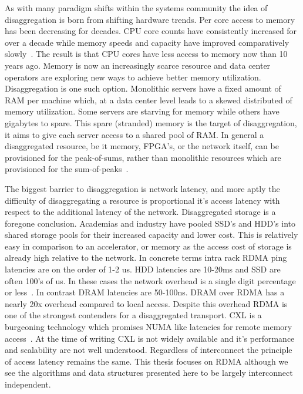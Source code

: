 \documentclass[12pt]{ucsddissertation}
\begin{document}
As with many paradigm shifts within the systems community the idea of disaggregation is born from
shifting hardware trends. Per core access to memory has been decreasing for decades. CPU core counts
have consistently increased for over a decade while memory speeds and capacity have improved
comparatively slowly~. The result is that CPU cores have less access to
memory now than 10 years ago. Memory is now an increasingly scarce resource and data center
operators are exploring new ways to achieve better memory utilization. Disaggregation is one such
option. Monolithic servers have a fixed amount of RAM per machine which, at a data center level leads
to a skewed distributed of memory utilization. Some servers are starving for memory while others
have gigabytes to spare. This spare (stranded) memory is the target of disaggregation, it aims to
give each server access to a shared pool of RAM. In general a disaggregated resource, be it memory,
FPGA's, or the network itself, can be provisioned for the peak-of-sums, rather than monolithic
resources which are provisioned for the sum-of-peaks~\cite{clio,supernic,dsnf}.

The biggest barrier to disaggregation is network latency, and more aptly the difficulty of
disaggregating a resource is proportional it's access latency with respect to the additional latency
of the network. Disaggregated storage is a foregone conclusion. Academias and industry have pooled
SSD's and HDD's into shared storage pools for their increased capacity and lower cost. This is
relatively easy in comparison to an accelerator, or memory as the access cost of storage is already
high relative to the network. In concrete terms intra rack RDMA ping latencies are on the order of
1-2 us. HDD latencies are 10-20ms and SSD are often 100's of us. In these cases the network overhead
is a single digit percentage or less~\cite{decible}. In
contrast DRAM latencies are 50-100ns. DRAM over RDMA has a nearly 20x overhead compared to local
access. Despite this overhead RDMA is one of the strongest contenders for a disaggregated transport.
CXL is a burgeoning technology which promises NUMA like latencies for remote memory
access~\cite{cxl}. At the time of writing CXL is not widely available and it's performance and
scalability are not well understood. Regardless of interconnect the principle of access latency
remains the same. This thesis focuses on RDMA although we see the algorithms and data structures
presented here to be largely interconnect independent.
\end{document}
